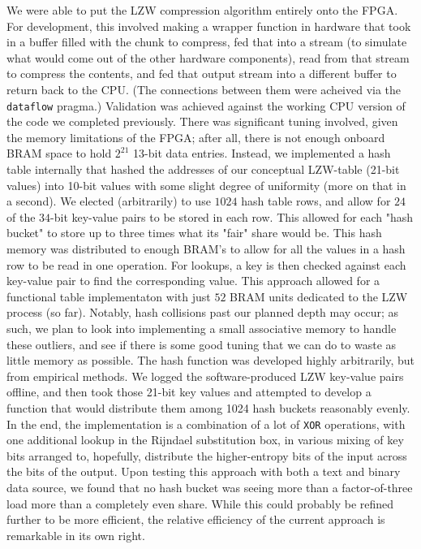 \documentclass{article}
\begin{document}
We were able to put the LZW compression algorithm entirely onto the FPGA. For development, this involved making a wrapper function in hardware that took in a buffer filled with the chunk to compress, fed that into a stream (to simulate what would come out of the other hardware components), read from that stream to compress the contents, and fed that output stream into a different buffer to return back to the CPU. (The connections between them were acheived via the \texttt{dataflow} pragma.)
\newline\newline
Validation was achieved against the working CPU version of the code we completed previously. There was significant tuning involved, given the memory limitations of the FPGA; after all, there is not enough onboard BRAM space to hold $2^{21}$ 13-bit data entries. Instead, we implemented a hash table internally that hashed the addresses of our conceptual LZW-table (21-bit values) into 10-bit values with some slight degree of uniformity (more on that in a second). We elected (arbitrarily) to use $1024$ hash table rows, and allow for $24$ of the $34$-bit key-value pairs to be stored in each row. This allowed for each "hash bucket" to store up to three times what its "fair" share would be. 
\newline\newline
This hash memory was distributed to enough BRAM's to allow for all the values in a hash row to be read in one operation. For lookups, a key is then checked against each key-value pair to find the corresponding value. This approach allowed for a functional table implementaton with just $52$ BRAM units dedicated to the LZW process (so far).
\newline\newline
Notably, hash collisions past our planned depth may occur;  as such, we plan to look into implementing a small associative memory to handle these outliers, and see if there is some good tuning that we can do to waste as little memory as possible.
\newline\newline
The hash function was developed highly arbitrarily, but from empirical methods. We logged the software-produced LZW key-value pairs offline, and then took those 21-bit key values and attempted to develop a function that would distribute them among 1024 hash buckets reasonably evenly. In the end, the implementation is a combination of a lot of \texttt{XOR} operations, with one additional lookup in the Rijndael substitution box, in various mixing of key bits arranged to, hopefully, distribute the higher-entropy bits of the input across the bits of the output. Upon testing this approach with both a text and binary data source, we found that no hash bucket was seeing more than a factor-of-three load more than a completely even share. While this could probably be refined further to be more efficient, the relative efficiency of the current approach is remarkable in its own right.
\end{document}
